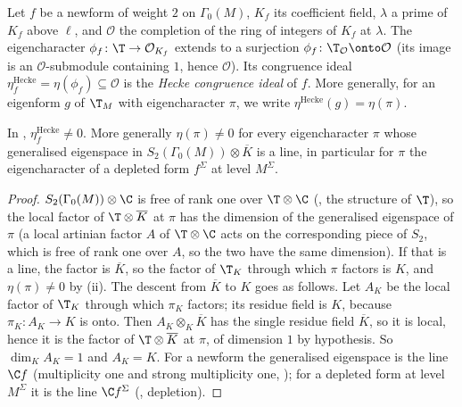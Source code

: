 \begin{definition}\label{def:congruence:newform-ideal}
Let $f$ be a newform of weight $2$ on $\Gamma_0(M)$, $K_f$ its coefficient field, $\lambda$ a prime of $K_f$ above $\ell$, and $\mathcal O$ the completion of the ring of integers of $K_f$ at
$\lambda$. The eigencharacter $\phi_f\colon\T\to\mathcal O_{K_f}$ extends to a surjection $\phi_f\colon\T_{\mathcal O}\onto\mathcal O$ (its image is an $\mathcal O$-submodule containing $1$, hence $\mathcal O$). Its
congruence ideal $\eta^{\mathrm{Hecke}}_f=\eta(\phi_f)\subseteq\mathcal O$ is the \emph{Hecke congruence ideal} of $f$. More generally, for an eigenform $g$ of $\T_M$ with eigencharacter $\pi$, we write
$\eta^{\mathrm{Hecke}}(g)=\eta(\pi)$.
\end{definition}

\begin{proposition}\label{prop:congruence:newform-ideal}
In , $\eta^{\mathrm{Hecke}}_f\ne0$. More generally $\eta(\pi)\ne0$ for every eigencharacter $\pi$ whose generalised eigenspace in $S_2(\Gamma_0(M))\otimes\overline K$ is a line,
in particular for $\pi$ the eigencharacter of a depleted form $f^\Sigma$ at level $M^\Sigma$.
\end{proposition}

\begin{proof}
$S_2(\Gamma_0(M))\otimes\C$ is free of rank one over $\T\otimes\C$ (, the structure of $\T$), so the local factor of $\T\otimes\overline K$ at $\pi$ has the dimension of the
generalised eigenspace of $\pi$ (a local artinian factor $A$ of $\T\otimes\C$ acts on the corresponding piece of $S_2$, which is free of rank one over $A$, so the two have the same
dimension). If that is a line, the factor is $\overline K$, so the factor of $\T_K$ through which $\pi$ factors is $K$, and $\eta(\pi)\ne0$ by
(ii). The descent from $\overline K$ to $K$ goes as follows. Let $A_K$ be the local factor of $\T_K$ through which $\pi_K$ factors; its residue field is $K$,
because $\pi_K\colon A_K\to K$ is onto. Then $A_K\otimes_K\overline K$ has the single residue field $\overline K$, so it is local, hence it is the factor of $\T\otimes\overline K$ at $\pi$, of dimension $1$ by
hypothesis. So $\dim_KA_K=1$ and $A_K=K$. For a newform the generalised eigenspace is the line $\C f$ (multiplicity one and strong multiplicity one, ); for
a depleted form at level $M^\Sigma$ it is the line $\C f^\Sigma$ (, depletion).
\end{proof}

